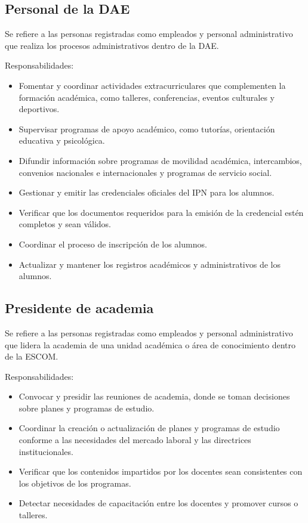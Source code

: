 \begin{Usuario}{\hypertarget{tPersonalDAE}{\subsection{Personal de la DAE}}}{
		Se refiere a las personas registradas como empleados y personal administrativo que realiza los procesos administrativos dentro de la DAE.
	}
	\item[Responsabilidades:] \cdtEmpty
	\begin{itemize}

		\item Fomentar y coordinar actividades extracurriculares que complementen la formación académica, como talleres, conferencias, eventos culturales y deportivos.
		\item Supervisar programas de apoyo académico, como tutorías, orientación educativa y psicológica.
		\item Difundir información sobre programas de movilidad académica, intercambios, convenios nacionales e internacionales y programas de servicio social.
		\item Gestionar y emitir las credenciales oficiales del IPN para los alumnos.
		\item Verificar que los documentos requeridos para la emisión de la credencial estén completos y sean válidos.
		\item Coordinar el proceso de inscripción de los alumnos.
		\item Actualizar y mantener los registros académicos y administrativos de los alumnos. 
	\end{itemize}


\end{Usuario}

\begin{Usuario}{\hypertarget{tPresidente}{\subsection{Presidente de academia}}}{
	Se refiere a las personas registradas como empleados y personal administrativo que lidera la academia de una unidad académica o área de conocimiento dentro de la ESCOM.
	}
	\item[Responsabilidades:] \cdtEmpty
	\begin{itemize}

		\item Convocar y presidir las reuniones de academia, donde se toman decisiones sobre planes y programas de estudio.
		\item Coordinar la creación o actualización de planes y programas de estudio conforme a las necesidades del mercado laboral y las directrices institucionales.
		\item Verificar que los contenidos impartidos por los docentes sean consistentes con los objetivos de los programas.
		\item Detectar necesidades de capacitación entre los docentes y promover cursos o talleres. 
	\end{itemize}

\end{Usuario}

